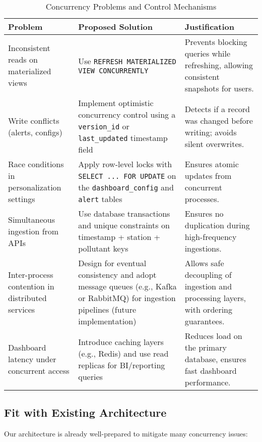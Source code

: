 \begin{table}[H]
\centering
\begin{tabularx}{\textwidth}{|X|X|X|}
\hline
\textbf{Problem} & \textbf{Proposed Solution} & \textbf{Justification} \\
\hline
Inconsistent reads on materialized views & Use \texttt{REFRESH MATERIALIZED VIEW CONCURRENTLY} & Prevents blocking queries while refreshing, allowing consistent snapshots for users. \\
\hline
Write conflicts (alerts, configs) & Implement optimistic concurrency control using a \texttt{version\_id} or \texttt{last\_updated} timestamp field & Detects if a record was changed before writing; avoids silent overwrites. \\
\hline
Race conditions in personalization settings & Apply row-level locks with \texttt{SELECT ... FOR UPDATE} on the \texttt{dashboard\_config} and \texttt{alert} tables & Ensures atomic updates from concurrent processes. \\
\hline
Simultaneous ingestion from APIs & Use database transactions and unique constraints on timestamp + station + pollutant keys & Ensures no duplication during high-frequency ingestions. \\
\hline
Inter-process contention in distributed services & Design for eventual consistency and adopt message queues (e.g., Kafka or RabbitMQ) for ingestion pipelines (future implementation) & Allows safe decoupling of ingestion and processing layers, with ordering guarantees. \\
\hline
Dashboard latency under concurrent access & Introduce caching layers (e.g., Redis) and use read replicas for BI/reporting queries & Reduces load on the primary database, ensures fast dashboard performance. \\
\hline
\end{tabularx}
\caption{Concurrency Problems and Control Mechanisms}
\end{table}

\subsection{Fit with Existing Architecture}

Our architecture is already well-prepared to mitigate many concurrency issues:

